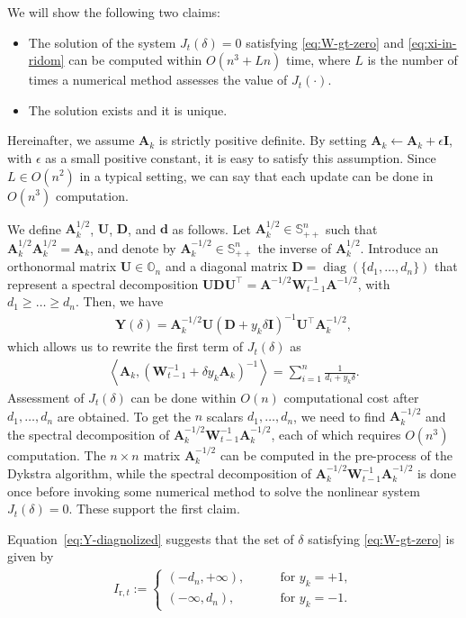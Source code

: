 \documentclass[10pt,onecolumn]{article}
\theoremstyle{definition}
\theoremstyle{definition}
\theoremstyle{definition}
\theoremstyle{definition}
\theoremstyle{definition}
\theoremstyle{theorem}
\newcommand{\0}{{\bm{0}}}
\newcommand{\1}{{\bm{1}}}
\newcommand{\vd}{{\bm{d}}}
\newcommand{\vA}{{\bm{A}}}
\newcommand{\vD}{{\bm{D}}}
\newcommand{\vI}{{\bm{I}}}
\newcommand{\bO}{{\mathbb{O}}}
\newcommand{\bS}{{\mathbb{S}}}
\newcommand{\vU}{{\bm{U}}}
\newcommand{\vW}{{\bm{W}}}
\newcommand{\Y}{{\bm{Y}}}
\DeclareMathOperator{\diag}{diag}
\begin{document}
We will show the following two claims:
\begin{itemize}
\item The solution of the
system $J_{t}(\delta)=0$ satisfying \eqref{eq:W-gt-zero}
and \eqref{eq:xi-in-ridom} can be
computed within $O(n^{3}+Ln)$ time, where $L$ is
the number of times a numerical method assesses the value of
$J_{t}(\cdot)$.
\\
\item The solution exists and it is unique.
\end{itemize}
Hereinafter, we assume $\vA_{k}$ is strictly positive definite.
By setting
$\vA_{k} \leftarrow \vA_{k} + \epsilon \vI$, with $\epsilon$ as a small positive
constant, it is easy to satisfy this assumption.
Since $L \in O(n^{2})$ in a typical setting, we can say that
each update can be done in $O(n^{3})$ computation.

We define $\vA^{1/2}_{k}$, $\vU$, $\vD$, and $\vd$ as follows.
Let $\vA_{k}^{1/2}\in\bS_{++}^{n}$
such that $\vA_{k}^{1/2}\vA_{k}^{1/2}=\vA_{k}$, and
denote by $\vA_{k}^{-1/2}\in\bS_{++}^{n}$ the inverse of $\vA_{k}^{1/2}$.
Introduce an orthonormal matrix $\vU\in\bO_{n}$ and
a diagonal matrix $\vD=\diag(\{d_{1},\dots,d_{n}\})$ that
represent a spectral decomposition
$\vU\vD\vU^{\top} = \vA^{-1/2}\vW_{t-1}^{-1}\vA^{-1/2}$,
with $d_{1}\ge\dots\ge d_{n}$.
Then, we have
\begin{align}\label{eq:Y-diagnolized}
\Y(\delta) =
\vA_{k}^{-1/2} \vU
(\vD + y_{k} \delta \vI)^{-1} \vU^{\top} \vA_{k}^{-1/2},
\end{align}
which allows us to rewrite the first term of $J_{t}(\delta)$ as
\begin{align}\label{eq:dotprod-linear-comp}
\left<\vA_k,
(\vW_{t-1}^{-1} + \delta y_{k} \vA_k)^{-1}
\right>
=
\sum_{i=1}^{n}\frac{1}{d_{i}+y_{k}\delta}.
\end{align}
Assessment of $J_{t}(\delta)$ can be
done within $O(n)$ computational cost after $d_{1},\dots,d_{n}$ are obtained.
To get the $n$ scalars $d_{1},\dots,d_{n}$,
we need to find $\vA_k^{-1/2}$ and the
spectral decomposition of $\vA^{-1/2}_k\vW_{t-1}^{-1}\vA^{-1/2}_k$,
each of which requires $O(n^{3})$ computation.
The $n\times n$ matrix $\vA^{-1/2}_{k}$ can be computed
in the pre-process of the Dykstra algorithm, while
the spectral decomposition of $\vA^{-1/2}_k\vW_{t-1}^{-1}\vA^{-1/2}_k$
is done once before invoking some numerical method to
solve the nonlinear system $J_{t}(\delta)=0$. These support the first claim.

Equation~\eqref{eq:Y-diagnolized} suggests that
the set of $\delta$ satisfying \eqref{eq:W-gt-zero}
is given by
\begin{align}\label{eq:int-nlrsys-for-upd-alph}
I_{\text{r},t} :=
\begin{cases}
( -d_{n},+\infty ), &\qquad \text{for $y_{k}=+1$},
\\
( -\infty, d_{n} ), &\qquad \text{for $y_{k}=-1$}.
\end{cases}
\end{align}
\end{document}
